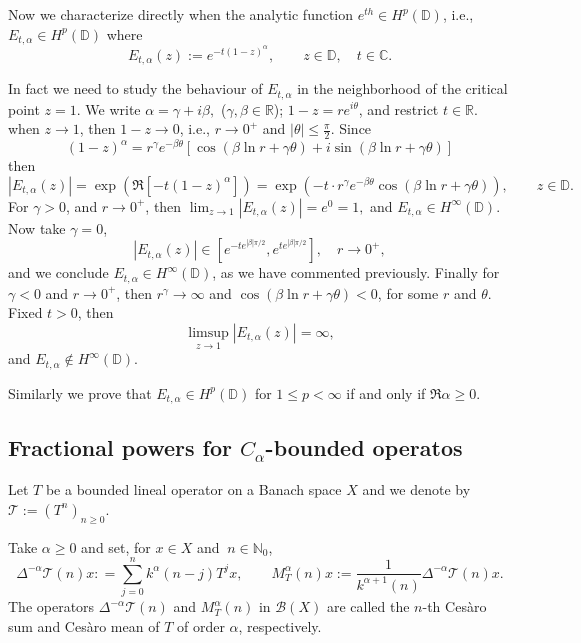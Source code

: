 \documentclass[a4paper,12pt]{amsart}
\def\N{\mathbb N}
\def\CC{\mathbb C}
\def\CC{\mathbb C}
\def\DD{\mathbb D}
\def\RR{\mathbb R}
\theoremstyle{definition}
\theoremstyle{remark}
\begin{document}
 Now we characterize  directly when the analytic function $e^{th}\in H^p(\DD)$, i.e., $E_{t,\alpha}\in H^p(\DD)$  where
$$
E_{t,\alpha}(z):= e^{-t(1-z)^\alpha}, \qquad z\in \DD,\quad  t\in \CC.
$$

 In fact we need to study  the behaviour of $E_{t,\alpha}$ in the neighborhood  of the critical point $z=1$.  We write $\alpha = \gamma + i\beta,$ ($\gamma,\beta \in \RR$); $1-z=re^{i\theta}$,  and restrict $t\in \RR$. when $z\to 1$, then $1-z\to 0$, i.e., $r\to 0^+$ and $|\theta| \leq \frac{\pi}{2}$.
Since
$$
(1-z)^\alpha = r^\gamma e^{-\beta \theta} \left[ \cos(\beta \ln r + \gamma \theta) + i \sin(\beta \ln r + \gamma \theta) \right]
$$
then
$$
|E_{t,\alpha}(z)| = \exp\left( {\Re}\left[ -t(1-z)^\alpha \right] \right) = \exp\left( -t \cdot r^\gamma e^{-\beta \theta} \cos(\beta \ln r + \gamma \theta) \right), \qquad z\in \DD.
$$
  For $\gamma > 0$, and $r \to 0^+$, then $\lim_{z \to 1} |E_{t,\alpha}(z)| = e^0 = 1,$ and  $ E_{t,\alpha}\in H^\infty(\DD)$. Now take $\gamma = 0$,
    \[ |E_{t,\alpha}(z)| \in \left[ e^{-t e^{|\beta|\pi/2}}, e^{t e^{|\beta|\pi/2}} \right], \quad r\to 0^+, \]
and we conclude $ E_{t,\alpha}\in H^\infty(\DD)$, as we have commented previously. Finally for $\gamma<0$  and $r \to 0^+$, then $r^\gamma \to \infty$ and   $\cos(\beta \ln r + \gamma \theta) < 0$, for some $r$ and $\theta.$ Fixed $t>0$, then
    \[ \limsup_{z \to 1} |E_{t,\alpha}(z)| = \infty,  \]
and $ E_{t,\alpha}\not\in H^\infty(\DD)$.

Similarly we  prove that  $ E_{t,\alpha}\in H^p(\DD)$ for $1\le p<\infty$ if and only if $\Re \alpha \ge 0.$




























\subsection{Fractional powers  for $C_\alpha$-bounded operatos} Let $T$ be a bounded lineal operator on a Banach space $X$ and we denote by $\mathcal{T}:= (T^n)_{n\ge 0}$.

Take $\alpha\ge0$ and set, for $x\in X$ and $\ n\in \N_0$,
\begin{equation*}
\Delta^{-\alpha} \mathcal{T}(n)x :
= \displaystyle\sum_{j=0}^n k^{\alpha}(n-j)T^j x,\qquad M_T^{\alpha}(n)x
:=\frac{1}{k^{\alpha+1}(n)}\Delta^{-\alpha} \mathcal{T}(n)x.
\end{equation*}
The operators $\Delta^{-\alpha} \mathcal{T}(n)$ and
$M^{\alpha}_T(n)$ in $\mathcal{B}(X)$ are called the $n$-th
Ces\`{a}ro sum and Ces\`{a}ro mean of $T$ of order $\alpha$, respectively.
\end{document}
